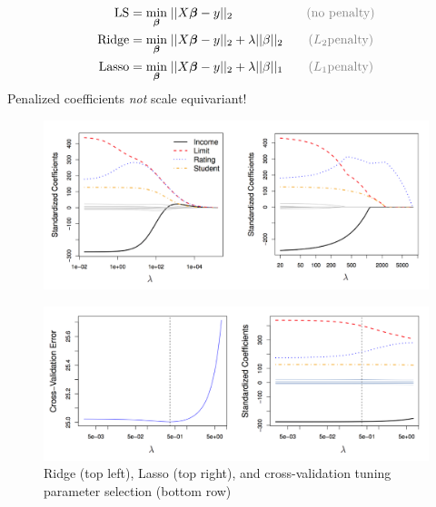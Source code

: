 \documentclass[11pt, oneside]{article}
\begin{document}
\begin{minipage}{0.555\linewidth} 
\begin{align*}
\textrm{LS} ={}& \displaystyle \underset{\boldsymbol{\beta}}{\textrm{min}} \; || X\boldsymbol{\beta} - y ||_2 \quad\quad\quad\quad\quad\;\;\; \textcolor{gray}{(\textrm{no penalty})} \\
\textrm{Ridge} ={}& \displaystyle \underset{\boldsymbol{\beta}}{\textrm{min}} \; || X\boldsymbol{\beta} - y ||_2  + \lambda ||\beta||_2  \quad\quad \textcolor{gray}{(L_2 \textrm{penalty})}\\
\textrm{Lasso} ={}& \displaystyle \underset{\boldsymbol{\beta}}{\textrm{min}} \; || X\boldsymbol{\beta} - y ||_2  + \lambda ||\beta||_1 
\quad\quad \textcolor{gray}{(L_1 \textrm{penalty})} 
\end{align*}
Penalized coefficients \emph{not} scale equivariant!
\end{minipage}
\begin{minipage}{0.5\linewidth} 
\end{minipage}

\newpage

\begin{figure}
\centering
 \includegraphics[width=5in]{regularize.png}

\includegraphics[width=5in]{chooseregularize.png}\\
\noindent Ridge (top left), Lasso (top right), and  cross-validation tuning parameter selection  (bottom row)
\end{figure}
\end{document}

